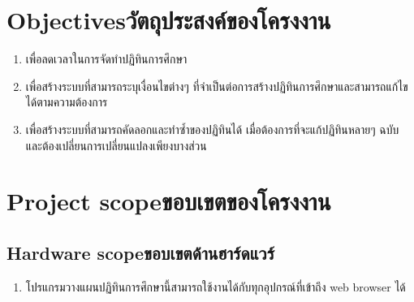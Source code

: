 

\section{\ifenglish Objectives\else วัตถุประสงค์ของโครงงาน\fi}
\begin{enumerate}
    \item เพื่อลดเวลาในการจัดทำปฏิทินการศึกษา
    \item เพื่อสร้างระบบที่สามารถระบุเงื่อนไขต่างๆ ที่จำเป็นต่อการสร้างปฏิทินการศึกษาและสามารถแก้ไขได้ตามความต้องการ
   \item เพื่อสร้างระบบที่สามารถคัดลอกและทำซ้ำของปฏิทินได้ เมื่อต้องการที่จะแก้ปฏิทินหลายๆ ฉบับ และต้องเปลี่ยนการเปลี่ยนแปลงเพียงบางส่วน%
\end{enumerate}

\section{\ifenglish Project scope\else ขอบเขตของโครงงาน\fi}

\subsection{\ifenglish Hardware scope\else ขอบเขตด้านฮาร์ดแวร์\fi}
\begin{enumerate}
\item โปรแกรมวางแผนปฏิทินการศึกษานี้สามารถใช้งานได้กับทุกอุปกรณ์ที่เข้าถึง web browser ได้ 
\end{enumerate}

